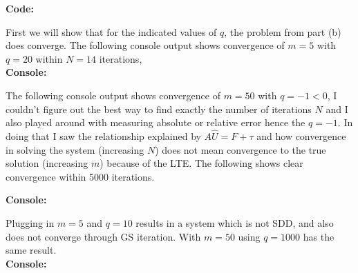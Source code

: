 \documentclass[12pt]{article}
\makeatletter
\theoremstyle{homework}
\newenvironment{exercise}[1]
{\def\@currentlabel{#1}\exercisecore}
{\endexercisecore}
\makeatother
\begin{document}
\begin{exercise}{Problem P15}
\begin{enumerate}
    \textbf{Code:}
    \begin{center}
      
    \end{center}

    First we will show that for the indicated values of $q$, the problem from part (b) does converge. The following console output 
    shows convergence of $m = 5$ with $q = 20$ within $N = 14$ iterations,\\

    \textbf{Console:}
    \begin{center}
      
    \end{center}


    The following console output shows convergence of $m = 50$ with $q = -1 < 0$, I couldn't figure out the best way to find exactly the number 
    of iterations $N$ and I also played around with measuring absolute or relative error hence the $q = -1$. In doing that I saw the relationship
    explained by $A\hat{U} = F + \tau$ and how convergence in solving the system (increasing $N$) does not mean convergence to the true solution (increasing $m$)
    because of the LTE. The following shows clear convergence within 5000 iterations. 

    \textbf{Console:}
    \begin{center}
      
    \end{center}

    Plugging in $m = 5$ and $q = 10$ results in a system which is not SDD, and also does not converge through GS iteration. With $m = 50$ using $q = 1000$ has the same result.\\ 

    \textbf{Console:}
    \begin{center}
      
    \end{center}    
  \end{enumerate}
  
\end{exercise}
\end{document}
